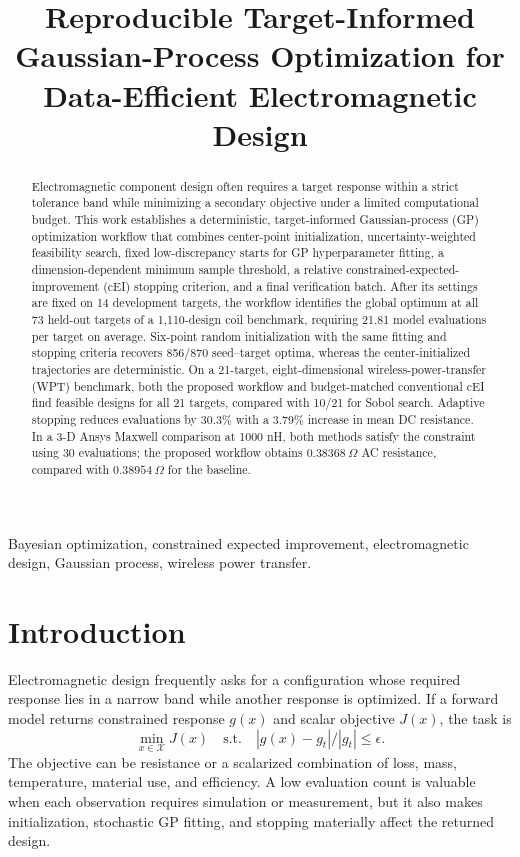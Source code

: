 \documentclass[10pt,conference,letterpaper]{IEEEtran}
\title{Reproducible Target-Informed Gaussian-Process Optimization for Data-Efficient Electromagnetic Design}
\author{\IEEEauthorblockN{Le Dong}
\IEEEauthorblockA{\textit{School of Electrical Engineering}\\
\textit{Xi'an Jiaotong University}\\
Xi'an, Shaanxi 710049, China\\
\texttt{leroi\_2024@stu.xjtu.edu.cn}}}
\begin{document}
\maketitle

\begin{abstract}
Electromagnetic component design often requires a target response within a strict tolerance band while minimizing a secondary objective under a limited computational budget. This work establishes a deterministic, target-informed Gaussian-process (GP) optimization workflow that combines center-point initialization, uncertainty-weighted feasibility search, fixed low-discrepancy starts for GP hyperparameter fitting, a dimension-dependent minimum sample threshold, a relative constrained-expected-improvement (cEI) stopping criterion, and a final verification batch. After its settings are fixed on 14 development targets, the workflow identifies the global optimum at all 73 held-out targets of a 1,110-design coil benchmark, requiring 21.81 model evaluations per target on average. Six-point random initialization with the same fitting and stopping criteria recovers 856/870 seed--target optima, whereas the center-initialized trajectories are deterministic. On a 21-target, eight-dimensional wireless-power-transfer (WPT) benchmark, both the proposed workflow and budget-matched conventional cEI find feasible designs for all 21 targets, compared with 10/21 for Sobol search. Adaptive stopping reduces evaluations by 30.3\% with a 3.79\% increase in mean DC resistance. In a 3-D Ansys Maxwell comparison at 1000 nH, both methods satisfy the constraint using 30 evaluations; the proposed workflow obtains $0.38368~\Omega$ AC resistance, compared with $0.38954~\Omega$ for the baseline.
\end{abstract}

\begin{IEEEkeywords}
Bayesian optimization, constrained expected improvement, electromagnetic design, Gaussian process, wireless power transfer.
\end{IEEEkeywords}

\section{Introduction}
Electromagnetic design frequently asks for a configuration whose required response lies in a narrow band while another response is optimized. If a forward model returns constrained response $g(x)$ and scalar objective $J(x)$, the task is
\begin{equation}
 \min_{x\in\mathcal X}J(x)\quad\mathrm{s.t.}\quad
 |g(x)-g_t|/|g_t|\leq\epsilon .
 \label{eq:problem}
\end{equation}
The objective can be resistance or a scalarized combination of loss, mass, temperature, material use, and efficiency. A low evaluation count is valuable when each observation requires simulation or measurement, but it also makes initialization, stochastic GP fitting, and stopping materially affect the returned design.
\end{document}

